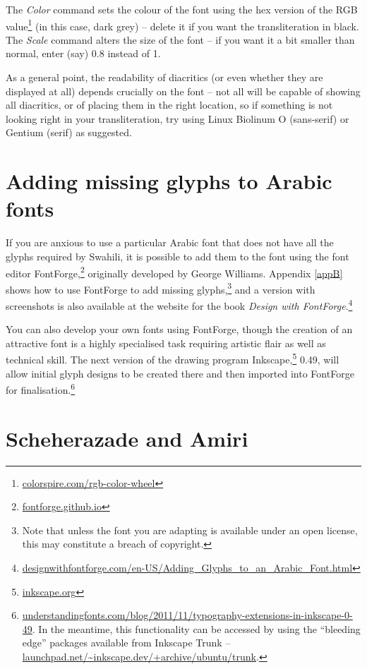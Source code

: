 The \textit{Color} command sets the colour of the font using the hex version of the RGB value\footnote{\url{colorspire.com/rgb-color-wheel}} (in this case, dark grey) -- delete it if you want the transliteration in black.  The \textit{Scale} command alters the size of the font -- if you want it a bit smaller than normal, enter (say) 0.8 instead of 1.

As a general point, the readability of diacritics (or even whether they are displayed at all) depends crucially on the font -- not all will be capable of showing all diacritics, or of placing them in the right location, so if something is not looking right in your transliteration, try using Linux Biolinum O (sans-serif) or Gentium (serif) as suggested. 

\section{Adding missing glyphs to Arabic fonts}

If you are anxious to use a particular Arabic font that does not have all the glyphs required by Swahili, it is possible to add them to the font using the font editor FontForge,\footnote{\url{fontforge.github.io}} originally developed by George Williams.  Appendix \ref{appB} shows how to use FontForge to add missing glyphs,\footnote{Note that unless the font you are adapting is available under an open license, this may constitute a breach of copyright.} and a version with screenshots is also available at the website for the book \textit{Design with FontForge}.\footnote{\url{designwithfontforge.com/en-US/Adding_Glyphs_to_an_Arabic_Font.html}}

You can also develop your own fonts using FontForge, though the creation of an attractive font is a highly specialised task requiring artistic flair as well as technical skill.   The next version of the drawing program Inkscape,\footnote{\url{inkscape.org}} 0.49, will allow initial glyph designs to be created there and then imported into FontForge for finalisation.\footnote{\url{understandingfonts.com/blog/2011/11/typography-extensions-in-inkscape-0-49}.  In the meantime, this functionality can be accessed by using the ``bleeding edge'' packages available from Inkscape Trunk -- \url{launchpad.net/~inkscape.dev/+archive/ubuntu/trunk}.}

\section{Scheherazade and Amiri}
\label{s:sham}

